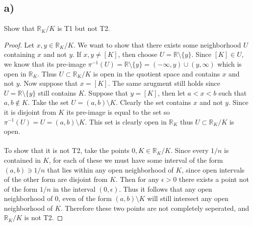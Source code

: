 \documentclass{article}
\theoremstyle{definition}
\begin{document}
\subsection*{a)}
\begin{mdframed}
    Show that $\mathbb{R}_K / K$ is T1 but not T2.
\end{mdframed}
\begin{proof}
    Let $x,y \in \mathbb{R}_K / K$. We want to show that there exists some neighborhood $U$ containing $x$ and not $y$.
    If $x,y \neq [K]$, then choose $U = \mathbb{R} \setminus \{y\}$. Since $[K] \in U$, we know that its pre-image $\pi^{-1}(U) = \mathbb{R} \setminus \{y\} = (-\infty,y) \cup (y, \infty)$
    which is open in $\mathbb{R}_K$. Thus $U \subset \mathbb{R}_K / K$ is open in the quotient space and contains $x$ and not $y$.
    Now suppose that $x = [K]$. The same arugment still holds since $U = \mathbb{R} \setminus \{y\}$ still contains $K$.
    Suppose that $y = [K]$, then let $a < x < b$ such that $a,b \notin K$. Take the set 
    $U = (a,b) \setminus K$. Clearly the set contains $x$ and not $y$. Since it is disjoint from $K$ its pre-image is equal to the set so $\pi^{-1}(U) = U = (a,b) \setminus K$.
    This set is clearly open in $\mathbb{R}_K$ thus $U \subset \mathbb{R}_K / K$ is open.\\\\
    To show that it is not T2, take the points $0, K \in \mathbb{R}_K / K$. Since every $1/ n$ is contained in $K$,
    for each of these we must have some interval of the form $(a,b) \ni 1/n$ that lies within any open neighborhood of $K$,
    since open intervals of the other form are disjoint from $K$. Then for any $\epsilon > 0$ there exists a point not of the form $1/n$ in the interval $(0, \epsilon)$.
    Thus it follows that any open neighborhood of $0$, even of the form $(a,b) \setminus K$ will still intersect any open neighborhood of $K$.
    Therefore these two points are not completely seperated, and $\mathbb{R}_K/K$ is not T2.
\end{proof}
\end{document}
